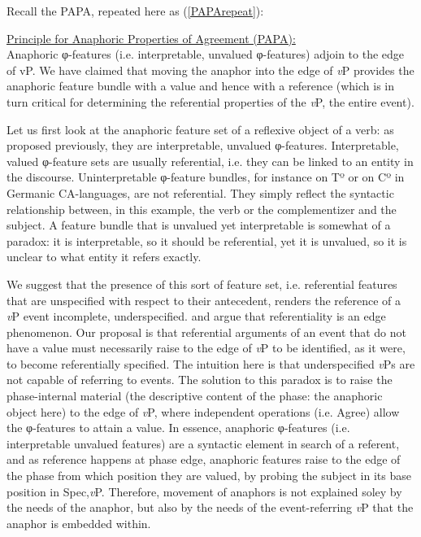 \documentclass[output=paper
,modfonts
,nonflat
]{langsci/langscibook}
\begin{document}
Recall the PAPA, repeated here as (\ref{PAPArepeat}): 

\ea \label{PAPArepeat} \underline{Principle for Anaphoric Properties of Agreement  (PAPA):} \\
Anaphoric φ-features (i.e. interpretable, unvalued φ-features) adjoin to the edge of vP.
\z
\noindent We have claimed that moving the anaphor into the edge of \textit{v}P provides the anaphoric feature bundle with a value and hence with a reference (which is in turn critical for determining the referential properties of the \textit{v}P, the entire event).

Let us first look at the anaphoric feature set of a reflexive object of a verb: as proposed previously, they are interpretable, unvalued φ-features. Interpretable, valued φ-feature sets are usually referential, i.e. they can be linked to an entity in the discourse. Uninterpretable φ-feature bundles, for instance on Tº or on Cº in Germanic CA-languages, are not referential. They simply reflect the syntactic relationship between, in this example, the verb or the complementizer and the subject. A feature bundle that is unvalued yet interpretable is somewhat of a paradox: it is interpretable, so it should be referential, yet it is unvalued, so it is unclear to what entity it refers exactly. 

We suggest that the presence of this sort of feature set, i.e. referential features that are unspecified with respect to their antecedent, renders the reference of a \textit{v}P event incomplete, underspecified. \citet{Hinzen:2012} and \citet{SheehanHinzen:2011} argue that referentiality is an edge phenomenon. Our proposal is that referential arguments of an event that do not have a value must necessarily raise to the edge of \textit{v}P to be identified, as it were, to become referentially specified. The intuition here is that underspecified \textit{v}Ps are not capable of referring to events. The solution to this paradox is to raise the phase-internal material (the descriptive content of the phase: the anaphoric object here) to the edge of \textit{v}P, where independent operations (i.e. Agree) allow the φ-features to attain a value. In essence, anaphoric φ-features (i.e. interpretable unvalued features) are a syntactic element in search of a referent, and as reference happens at phase edge, anaphoric features raise to the edge of the phase from which position they are valued, by probing the subject in its base position in Spec,\textit{v}P. Therefore, movement of anaphors is not explained soley by the needs of the anaphor, but also by the needs of the event-referring \textit{v}P that the anaphor is embedded within.
\end{document}
